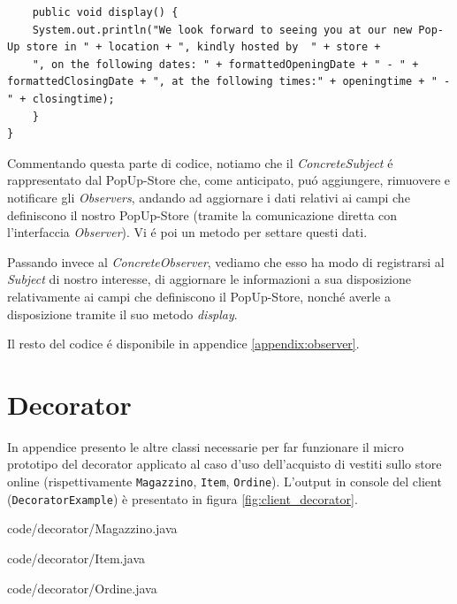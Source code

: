 \documentclass[12pt]{article}
\begin{document}
\begin{lstlisting}
    public void display() {
    System.out.println("We look forward to seeing you at our new Pop-Up store in " + location + ", kindly hosted by  " + store + 
    ", on the following dates: " + formattedOpeningDate + " - " + formattedClosingDate + ", at the following times:" + openingtime + " - " + closingtime);
    } 
}

\end{lstlisting}

Commentando questa parte di codice, notiamo che il \textit{ConcreteSubject} \'e rappresentato dal PopUp-Store che, come anticipato, pu\'o aggiungere, rimuovere e notificare gli \textit{Observers}, andando ad aggiornare i dati relativi ai campi che definiscono il nostro PopUp-Store (tramite la comunicazione diretta con l'interfaccia \textit{Observer}). Vi \'e poi un metodo per settare questi dati. 

Passando invece al \textit{ConcreteObserver}, vediamo che esso ha modo di registrarsi al \textit{Subject} di nostro interesse, di aggiornare le informazioni a sua disposizione relativamente ai campi che definiscono il PopUp-Store, nonch\'e averle a disposizione tramite il suo metodo \textit{display}. 

Il resto del codice \'e disponibile in appendice \ref{appendix:observer}.


\newpage

\printbibliography

\newpage
\appendix

\section{Decorator}
\label{appendix:decorator}
In appendice presento le altre classi necessarie per far funzionare il micro prototipo del decorator applicato al caso d'uso dell'acquisto di vestiti sullo store online (rispettivamente {\tt Magazzino}, {\tt Item}, {\tt Ordine}). L'output in console del client ({\tt DecoratorExample}) è presentato in figura \ref{fig:client_decorator}.


{code/decorator/Magazzino.java}


{code/decorator/Item.java}


{code/decorator/Ordine.java}
\end{document}
